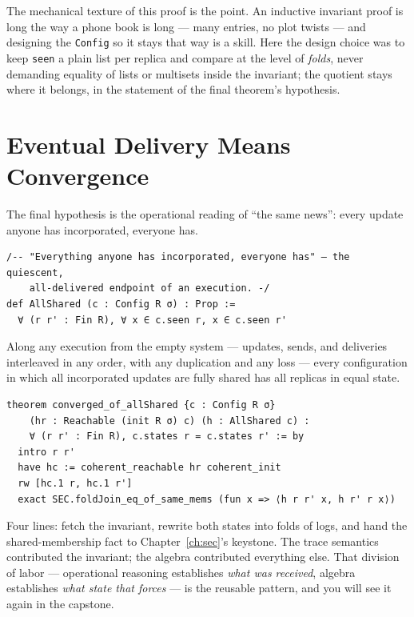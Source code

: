 \documentclass[12pt, a4paper, openright]{book}
\theoremstyle{thmstyle}
\theoremstyle{defstyle}
\newcommand{\lc}[1]{\texttt{#1}}
\newenvironment{thmbox}[1][]{%
  \begin{tcolorbox}[thmbox, title={\ifx\\#1\\Theorem\else#1\fi}]%
}{\end{tcolorbox}}
\begin{document}
The mechanical texture of this proof is the point. An inductive invariant
proof is long the way a phone book is long --- many entries, no plot
twists --- and designing the \lc{Config} so it stays that way is a skill.
Here the design choice was to keep \lc{seen} a plain list per replica and
compare at the level of \emph{folds}, never demanding equality of lists
or multisets inside the invariant; the quotient stays where it belongs,
in the statement of the final theorem's hypothesis.

\section{Eventual Delivery Means Convergence}

The final hypothesis is the operational reading of ``the same news'':
every update anyone has incorporated, everyone has.

\begin{verbatim}
/-- "Everything anyone has incorporated, everyone has" — the quiescent,
    all-delivered endpoint of an execution. -/
def AllShared (c : Config R σ) : Prop :=
  ∀ (r r' : Fin R), ∀ x ∈ c.seen r, x ∈ c.seen r'
\end{verbatim}

\begin{thmbox}[Eventual delivery $\Rightarrow$ convergence]
  Along any execution from the empty system --- updates, sends, and
  deliveries interleaved in any order, with any duplication and any
  loss --- every configuration in which all incorporated updates are
  fully shared has all replicas in equal state.
\end{thmbox}

\begin{verbatim}
theorem converged_of_allShared {c : Config R σ}
    (hr : Reachable (init R σ) c) (h : AllShared c) :
    ∀ (r r' : Fin R), c.states r = c.states r' := by
  intro r r'
  have hc := coherent_reachable hr coherent_init
  rw [hc.1 r, hc.1 r']
  exact SEC.foldJoin_eq_of_same_mems (fun x => ⟨h r r' x, h r' r x⟩)
\end{verbatim}

Four lines: fetch the invariant, rewrite both states into folds of logs,
and hand the shared-membership fact to Chapter~\ref{ch:sec}'s keystone.
The trace semantics contributed the invariant; the algebra contributed
everything else. That division of labor --- operational reasoning
establishes \emph{what was received}, algebra establishes \emph{what
state that forces} --- is the reusable pattern, and you will see it again
in the capstone.
\end{document}
